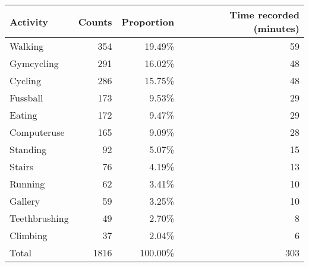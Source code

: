 \begin{tabular}{lrrr}
\toprule
      Activity &  Counts &  Proportion &  Time recorded (minutes) \\
\midrule
       Walking &     354 &      19.49\% &                       59 \\
    Gymcycling &     291 &      16.02\% &                       48 \\
       Cycling &     286 &      15.75\% &                       48 \\
      Fussball &     173 &       9.53\% &                       29 \\
        Eating &     172 &       9.47\% &                       29 \\
   Computeruse &     165 &       9.09\% &                       28 \\
      Standing &      92 &       5.07\% &                       15 \\
        Stairs &      76 &       4.19\% &                       13 \\
       Running &      62 &       3.41\% &                       10 \\
       Gallery &      59 &       3.25\% &                       10 \\
 Teethbrushing &      49 &       2.70\% &                        8 \\
      Climbing &      37 &       2.04\% &                        6 \\
         Total &    1816 &     100.00\% &                      303 \\
\bottomrule
\end{tabular}
